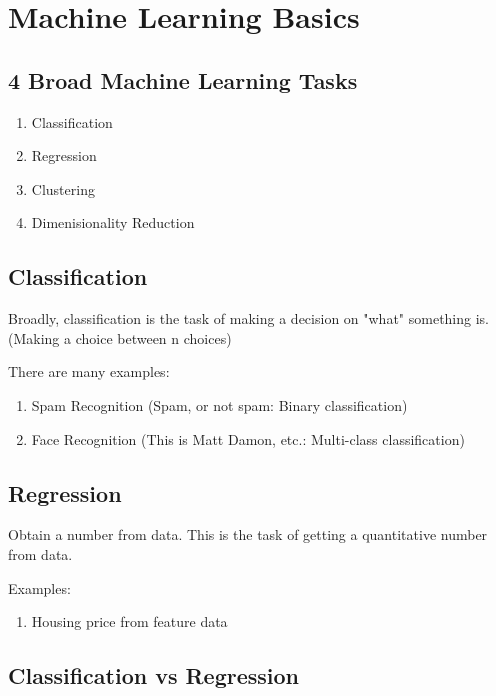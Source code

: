 \documentclass[11pt]{article}
\author{Andrew Chen}
\date{\today}
\title{}
\begin{document}
\tableofcontents

\section{Machine Learning Basics}
\label{sec:org01219e3}


\subsection{4 Broad Machine Learning Tasks}
\label{sec:org33d2155}

\begin{enumerate}
\item Classification
\item Regression
\item Clustering
\item Dimenisionality Reduction
\end{enumerate}

\subsection{Classification}
\label{sec:org63f4d3b}

Broadly, classification is the task of making a decision on "what" something is. (Making a choice between n choices)

There are many examples:

\begin{enumerate}
\item Spam Recognition (Spam, or not spam: Binary classification)
\item Face Recognition (This is Matt Damon, etc.: Multi-class classification)
\end{enumerate}

\subsection{Regression}
\label{sec:org6ca3734}

Obtain a number from data. This is the task of getting a quantitative number from data.

Examples:

\begin{enumerate}
\item Housing price from feature data
\end{enumerate}


\subsection{Classification vs Regression}
\label{sec:orgd25b068}
\end{document}
